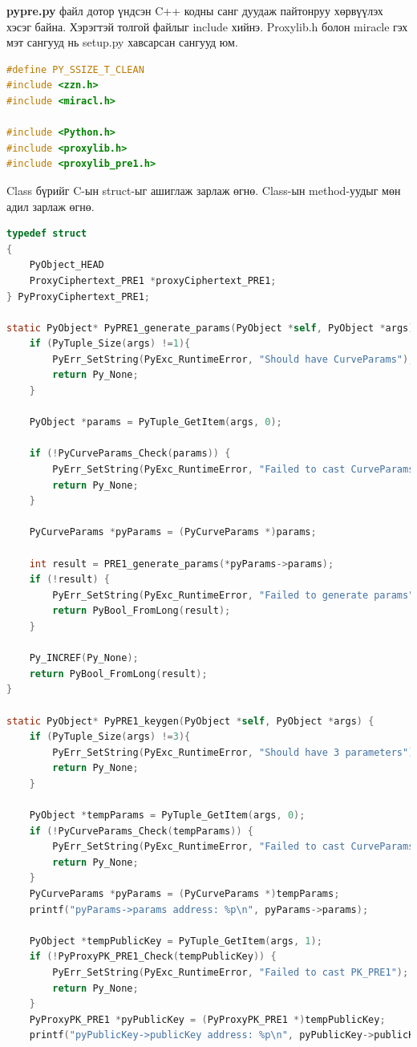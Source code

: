 \textbf{pypre.py} файл дотор үндсэн C++ кодны санг дуудаж пайтонруу хөрвүүлэх хэсэг байна. 
Хэрэгтэй толгой файлыг include хийнэ. Proxylib.h болон miracle гэх мэт сангууд нь setup.py хавсарсан сангууд юм.

\begin{lstlisting}[language=C, caption={setup.py}]
#define PY_SSIZE_T_CLEAN
#include <zzn.h>
#include <miracl.h>

#include <Python.h>
#include <proxylib.h>
#include <proxylib_pre1.h>    
\end{lstlisting}

\noindent Class бүрийг C-ын struct-ыг ашиглаж зарлаж өгнө. Class-ын method-уудыг мөн адил зарлаж өгнө. 

\begin{lstlisting}[language=C, caption={setup.py}]
typedef struct
{
    PyObject_HEAD
    ProxyCiphertext_PRE1 *proxyCiphertext_PRE1;
} PyProxyCiphertext_PRE1;

static PyObject* PyPRE1_generate_params(PyObject *self, PyObject *args) {
    if (PyTuple_Size(args) !=1){
        PyErr_SetString(PyExc_RuntimeError, "Should have CurveParams");
        return Py_None;
    }

    PyObject *params = PyTuple_GetItem(args, 0);

    if (!PyCurveParams_Check(params)) {
        PyErr_SetString(PyExc_RuntimeError, "Failed to cast CurveParams");
        return Py_None;
    }

    PyCurveParams *pyParams = (PyCurveParams *)params;

    int result = PRE1_generate_params(*pyParams->params);
    if (!result) {
        PyErr_SetString(PyExc_RuntimeError, "Failed to generate params");
        return PyBool_FromLong(result);
    }

    Py_INCREF(Py_None);
    return PyBool_FromLong(result);
}

static PyObject* PyPRE1_keygen(PyObject *self, PyObject *args) {
    if (PyTuple_Size(args) !=3){
        PyErr_SetString(PyExc_RuntimeError, "Should have 3 parameters");
        return Py_None;
    }

    PyObject *tempParams = PyTuple_GetItem(args, 0);
    if (!PyCurveParams_Check(tempParams)) {
        PyErr_SetString(PyExc_RuntimeError, "Failed to cast CurveParams");
        return Py_None;
    }
    PyCurveParams *pyParams = (PyCurveParams *)tempParams;
    printf("pyParams->params address: %p\n", pyParams->params);

    PyObject *tempPublicKey = PyTuple_GetItem(args, 1);
    if (!PyProxyPK_PRE1_Check(tempPublicKey)) {
        PyErr_SetString(PyExc_RuntimeError, "Failed to cast PK_PRE1");
        return Py_None;
    }
    PyProxyPK_PRE1 *pyPublicKey = (PyProxyPK_PRE1 *)tempPublicKey;
    printf("pyPublicKey->publicKey address: %p\n", pyPublicKey->publicKey);


\end{lstlisting}
